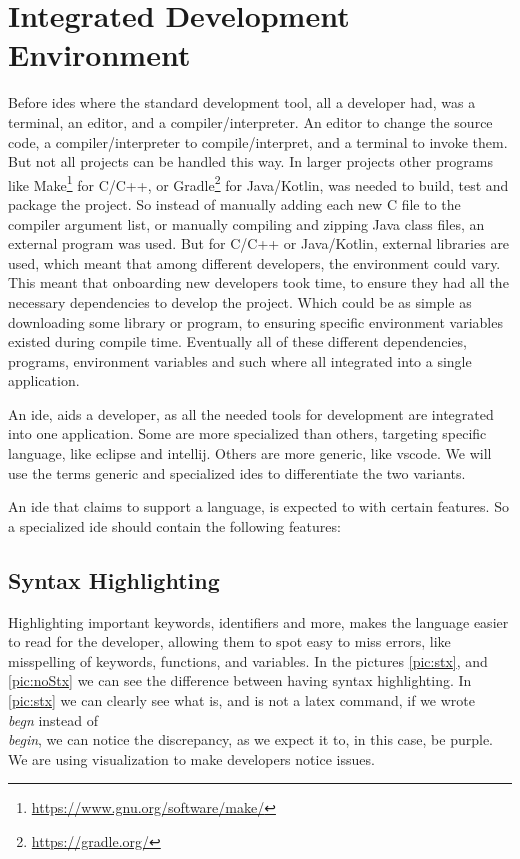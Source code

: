\section{Integrated Development Environment} \label{sec:ide}

Before \gls{ide}s where the standard development tool, all a developer had, was
a terminal, an editor, and a compiler/interpreter. An editor to change the
source code, a compiler/interpreter to compile/interpret, and a terminal to
invoke them. But not all projects can be handled this way. In larger projects
other programs like
Make\footnote{\url{https://www.gnu.org/software/make/}} for C/C++, or
Gradle\footnote{\url{https://gradle.org/}} for Java/Kotlin, was needed to
build, test and package the project. So instead of manually adding each new C
file to the compiler argument list, or manually compiling and zipping Java class
files, an external program was used. But for C/C++ or Java/Kotlin, external
libraries are used, which meant that among different developers, the environment
could vary. This meant that onboarding new developers took time, to ensure they
had all the necessary dependencies to develop the project. Which could be as
simple as downloading some library or program, to ensuring specific environment
variables existed during compile time. Eventually all of these different
dependencies, programs, environment variables and such where all integrated into
a single application.

An \gls{ide}, aids a developer, as all the needed tools for development are
integrated into one application. Some are more specialized than others,
targeting specific language, like \gls{eclipse} and \gls{intellij}. Others are
more generic, like \gls{vscode}. We will use the terms generic and specialized
\gls{ide}s to differentiate the two variants.

An \gls{ide} that claims to support a language, is expected to with certain
features. So a specialized \gls{ide} should contain the following features:

\subsection{Syntax Highlighting}

Highlighting important keywords, identifiers and more, makes the language easier
to read for the developer, allowing them to spot easy to miss errors, like
misspelling of keywords, functions, and variables. In the pictures
\ref{pic:stx}, and \ref{pic:noStx} we can see the difference between having
syntax highlighting. In \ref{pic:stx} we can clearly see what is, and is not a
latex command, if we wrote \textit{\\begn} instead of \textit{\\begin}, we can
notice the discrepancy, as we expect it to, in this case, be purple. We are
using visualization to make developers notice issues.

